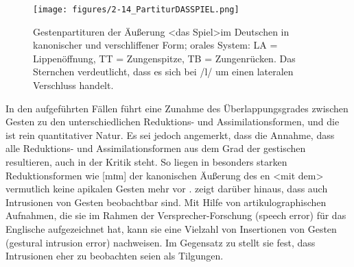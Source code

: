 \begin{figure}
	\texttt{[image: figures/2-14\_PartiturDASSPIEL.png]}
	\caption{Gestenpartituren der Äußerung <das Spiel>im Deutschen in kanonischer und verschliffener Form; orales System: LA = Lippenöffnung, TT = Zungenspitze, TB = Zungenrücken. Das Sternchen verdeutlicht, dass es sich bei /l/ um einen lateralen Verschluss handelt.}
	\label{figure:0214}
\end{figure}

\newpage 
In den aufgeführten Fällen führt eine Zunahme des Überlappungsgrades zwischen Gesten zu den unterschiedlichen Reduktions- und Assimilationsformen, und die  ist rein quantitativer Natur. Es sei jedoch angemerkt, dass die Annahme, dass alle Reduktions- und Assimilationsformen aus dem Grad der gestischen  resultieren, auch in der Kritik steht. So liegen in besonders starken Reduktionsformen wie [mɪm] der kanonischen Äußerung des en <mit dem> vermutlich keine apikalen Gesten mehr vor \citep{Kohler1992}. \citet{Pouplier2007} zeigt darüber hinaus, dass auch Intrusionen von Gesten beobachtbar sind. Mit Hilfe von artikulographischen Aufnahmen, die sie im Rahmen der Versprecher-Forschung (speech error) für das Englische aufgezeichnet hat, kann sie eine Vielzahl von Insertionen von Gesten (gestural intrusion error) nachweisen. Im Gegensatz zu \citet{Kohler1992} stellt sie fest, dass Intrusionen eher zu beobachten seien als Tilgungen.